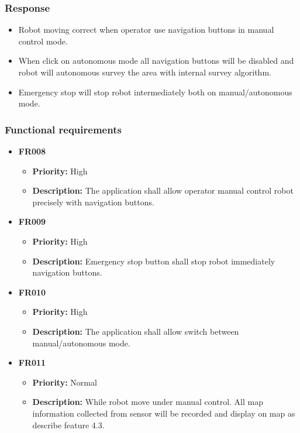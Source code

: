 \documentclass[10pt,a4paper,titlepage]{article}
\begin{document}
	\subsubsection*{Response}
	\begin{itemize}
		\item Robot moving correct when operator use navigation buttons in manual control mode.
		\item When click on autonomous mode all navigation buttons will be disabled and robot will autonomous survey the area with internal survey algorithm.
		\item Emergency stop will stop robot intermediately both on manual/autonomous mode.
	\end{itemize}
	
	\subsubsection*{Functional requirements}
	\begin{itemize}
		
		\item \textbf{FR008} 
		\begin{itemize}
			\item \textbf{Priority:} High
			\item \textbf{Description:} The application shall allow operator manual control robot precisely with navigation buttons.
		\end{itemize}
		\item \textbf{FR009} 
		\begin{itemize}
		\item \textbf{Priority:} High
		\item \textbf{Description:} Emergency stop button shall stop robot immediately navigation buttons.
		\end{itemize}
	
		\item \textbf{FR010} 
		\begin{itemize}
			\item \textbf{Priority:} High
			\item \textbf{Description:} The application shall allow switch between manual/autonomous mode.
		\end{itemize}
	
		\item \textbf{FR011} 
		\begin{itemize}
			\item \textbf{Priority:} Normal
			\item \textbf{Description:} While robot move under manual control. All map information collected from sensor will be recorded and display on map as describe feature 4.3.
		\end{itemize}
	\end{itemize}
	
\end{document}
